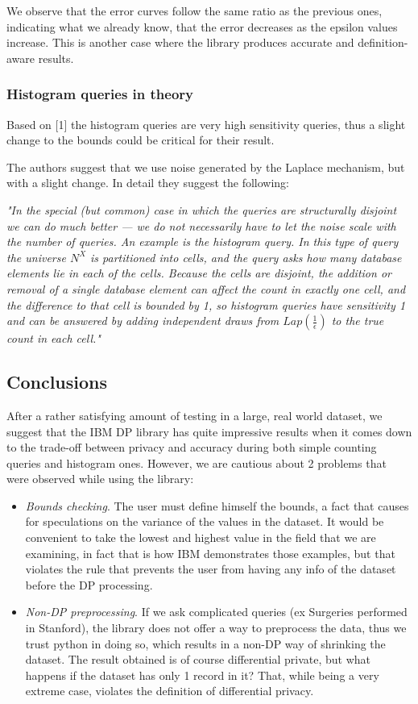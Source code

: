 We observe that the error curves follow the same ratio as the previous ones, indicating what we already know, that the error decreases as the epsilon values increase. This is another case where the library produces accurate and definition-aware results. 

\subsubsection{Histogram queries in theory}
Based on [1] the histogram queries are very high sensitivity queries, thus a slight change to the bounds could be critical for their result. 

The authors suggest that we use noise generated by the Laplace mechanism, but with a slight change. In detail they suggest the following:

\textit{"In the special (but common) case in which the queries are structurally disjoint we can do much better — we do not necessarily have to let the noise scale with the number of queries. An example is the histogram query. In this type of query the universe $N^X$ is partitioned into cells, and the query asks how many database elements lie in each of the cells. Because the cells are disjoint, the addition or removal of a single database element can affect the count in exactly one cell, and the difference to that cell is bounded by 1, so histogram queries have sensitivity 1 and can be answered by adding independent draws from $Lap(\frac{1}{\epsilon})$ to the true count in each cell."}
\clearpage

\subsection{Conclusions}

After a rather satisfying amount of testing in a large, real world dataset, we suggest that the IBM DP library has quite impressive results when it comes down to the trade-off between privacy and accuracy during both simple counting queries and histogram ones. However, we are cautious about 2 problems that were observed while using the library:

\begin{itemize}
 \item \emph{Bounds checking}. The user must define himself the bounds, a fact that causes for speculations on the variance of the values in the dataset. It would be convenient to take the lowest and highest value in the field that we are examining, in fact that is how IBM demonstrates those examples, but that violates the rule that prevents the user from having any info of the dataset before the DP processing.
 
 \item \emph{Non-DP preprocessing}. If we ask complicated queries (ex Surgeries performed in Stanford), the library does not offer a way to preprocess the data, thus we trust python in doing so, which results in a non-DP way of shrinking the dataset. The result obtained is of course differential private, but what happens if the dataset has only 1 record in it? That, while being a very extreme case, violates the definition of differential privacy.
\end{itemize}

